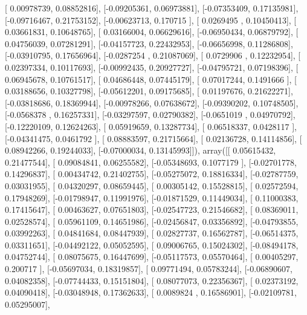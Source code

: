 \documentclass{article}
\begin{document}
       [ 0.00978739,  0.08852816],
       [-0.09205361,  0.06973881],
       [-0.07353409,  0.17135981],
       [-0.09716467,  0.21753152],
       [-0.00623713,  0.170715  ],
       [ 0.0269495 ,  0.10450413],
       [ 0.03661831,  0.10648765],
       [ 0.03166004,  0.06629616],
       [-0.06950434,  0.06879792],
       [ 0.04756039,  0.07281291],
       [-0.04157723,  0.22432953],
       [-0.06656998,  0.11286808],
       [-0.03910795,  0.17656964],
       [-0.0287254 ,  0.21087069],
       [ 0.0729906 ,  0.12232954],
       [ 0.02397334,  0.10117693],
       [-0.00992435,  0.20927727],
       [-0.04795721,  0.07198396],
       [ 0.06945678,  0.10761517],
       [ 0.04686448,  0.07445179],
       [ 0.07017244,  0.1491666 ],
       [ 0.03188656,  0.10327798],
       [-0.05612201,  0.09175685],
       [ 0.01197676,  0.21622271],
       [-0.03818686,  0.18369944],
       [-0.00978266,  0.07638672],
       [-0.09390202,  0.10748505],
       [-0.0568378 ,  0.16257331],
       [-0.03297597,  0.02790382],
       [-0.0651019 ,  0.04970792],
       [-0.12220109,  0.12624263],
       [ 0.05919659,  0.13287734],
       [ 0.06518337,  0.0428117 ],
       [-0.04341475,  0.0461792 ],
       [ 0.08883597,  0.21715664],
       [ 0.02136728,  0.14114856],
       [ 0.08942266,  0.19244033],
       [-0.07000034,  0.13145993]]), array([[ 0.05615432,  0.21477544],
       [ 0.09084841,  0.06255582],
       [-0.05348693,  0.1077179 ],
       [-0.02701778,  0.14296837],
       [ 0.00434742,  0.21402755],
       [-0.05275072,  0.18816334],
       [-0.02787759,  0.03031955],
       [ 0.04320297,  0.08659445],
       [ 0.00305142,  0.15528815],
       [ 0.02572594,  0.17948269],
       [-0.01798947,  0.11991976],
       [-0.01871529,  0.11449034],
       [ 0.11000383,  0.17415647],
       [ 0.00463627,  0.07651803],
       [-0.02547723,  0.21546682],
       [ 0.08369011,  0.02528574],
       [ 0.05961109,  0.14651986],
       [-0.02456847,  0.03356892],
       [-0.04793855,  0.03992263],
       [ 0.04841684,  0.08447939],
       [ 0.02827737,  0.16562787],
       [-0.06514375,  0.03311651],
       [-0.04492122,  0.05052595],
       [ 0.09006765,  0.15024302],
       [-0.08494178,  0.04752744],
       [ 0.08075675,  0.16447699],
       [-0.05117573,  0.05570464],
       [ 0.00405297,  0.200717  ],
       [-0.05697034,  0.18319857],
       [ 0.09771494,  0.05783244],
       [-0.06890607,  0.04082358],
       [-0.07744433,  0.15151804],
       [ 0.08077073,  0.22356367],
       [ 0.02373192,  0.04090418],
       [-0.03048948,  0.17362633],
       [ 0.0089824 ,  0.16586901],
       [-0.02109781,  0.05295007],
\end{document}
